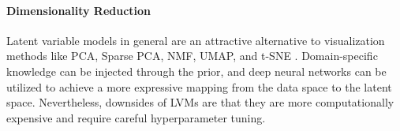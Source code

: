 \documentclass[letterpaper]{article} %
\begin{document}




\paragraph{Dimensionality Reduction}
Latent variable models in general are an attractive alternative to visualization methods like PCA, Sparse PCA, NMF, UMAP, and t-SNE \citep{wold1987principal,kuleshov2013fast,NIPS2000_f9d11525,mcinnes2018umap,van2008visualizing}. Domain-specific knowledge can be injected through the prior, and deep neural networks can be utilized to achieve a more expressive mapping from the data space to the latent space. Nevertheless, downsides of LVMs are that they are more computationally expensive and require careful hyperparameter tuning. %
\end{document}
